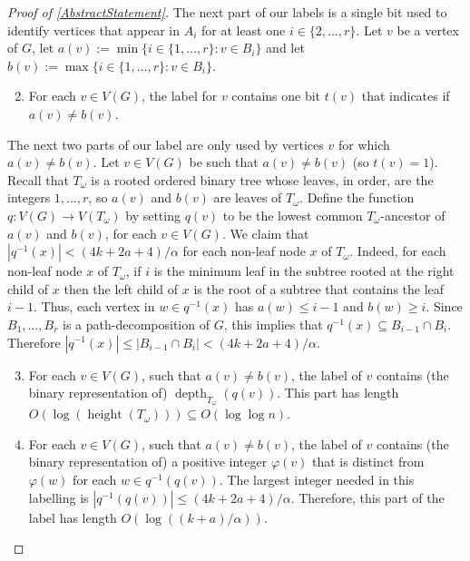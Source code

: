 \documentclass{patmorin}
\DeclareMathOperator{\height}{height}
\DeclareMathOperator{\depth}{depth}
\renewcommand{\ge}{\geqslant}
\renewcommand{\le}{\leqslant}
\newcommand{\defin}[1]{\emph{\textcolor{brightmaroon}{#1}}}
\begin{document}
\begin{proof}[Proof of \cref{AbstractStatement}]
    The next part of our labels is a single bit used to identify vertices that appear in $A_i$ for at least one $i\in\{2,\ldots,r\}$. Let $v$ be a vertex of $G$, let $a(v):=\min\{i\in\{1,\ldots,r\}:v\in B_i\}$ and let $b(v):=\max\{i\in\{1,\ldots,r\}:v\in B_i\}$.
    \begin{enumerate}[nosep,nolistsep,label=(P\arabic*)]\setcounter{enumi}{1}
      \item\label{flag_part} For each $v\in V(G)$, the label for $v$ contains one bit \defin{$t(v)$} that indicates if $a(v)\neq b(v)$.
    \end{enumerate}

    The next two parts of our label are only used by vertices $v$ for which $a(v)\neq b(v)$.  Let $v\in V(G)$ be such that $a(v)\neq b(v)$ (so $t(v)=1$).  Recall that $T_\omega$ is a rooted ordered binary tree whose leaves, in order, are the integers $1,\ldots,r$, so $a(v)$ and $b(v)$ are leaves of $T_\omega$.
    Define the function $q:V(G)\to V(T_\omega)$ by setting
    $q(v)$ to be the lowest common $T_\omega$-ancestor of $a(v)$ and $b(v)$, for each $v\in V(G)$.  We claim that  $|q^{-1}(x)|< (4k+2a+4)/\alpha$ for each non-leaf node $x$ of $T_\omega$.  Indeed, for each non-leaf node $x$ of $T_\omega$, if $i$ is the minimum leaf in the subtree rooted at the right child of $x$ then the left child of $x$ is the root of a subtree that contains the leaf $i-1$.  Thus,
    each vertex in $w\in q^{-1}(x)$ has $a(w)\le i-1$ and $b(w)\ge i$.  Since $B_1,\ldots, B_r$ is a path-decomposition of $G$, this implies that $q^{-1}(x)\subseteq B_{i-1}\cap B_i$.  Therefore $|q^{-1}(x)|\le |B_{i-1}\cap B_i| < (4k+2a+4)/\alpha$.

    \begin{enumerate}[nosep,nolistsep,label=(P\arabic*)]\setcounter{enumi}{2}
      \item\label{lca_part} For each $v\in V(G)$, such that $a(v)\neq b(v)$, the label of $v$ contains (the binary representation of) $\depth_{T_\omega}(q(v))$. This part has length $O(\log(\height(T_\omega)))\subseteq O(\log\log n)$.

      \item\label{colour_part} For each $v\in V(G)$, such that $a(v)\neq b(v)$, the label of $v$ contains (the binary representation of) a positive integer $\varphi(v)$ that is distinct from $\varphi(w)$ for each $w\in q^{-1}(q(v))$.  The largest integer needed in this labelling is $|q^{-1}(q(v))|\le (4k+2a+4)/\alpha$. Therefore, this part of the label has length $O(\log ((k+a)/\alpha))$.
    \end{enumerate}


\end{proof}
\end{document}

